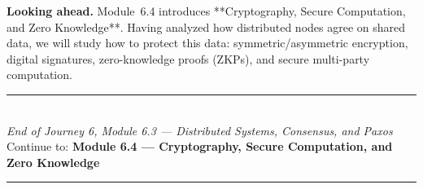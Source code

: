 \documentclass[12pt, a4paper]{book}
\begin{document}
\medskip
\noindent\textbf{Looking ahead.}
Module~6.4 introduces **Cryptography, Secure Computation, and Zero Knowledge**. Having analyzed how distributed nodes agree on shared data, we will study how to protect this data: symmetric/asymmetric encryption, digital signatures, zero-knowledge proofs (ZKPs), and secure multi-party computation.

\vspace{1.4cm}
\begin{center}
{\color{JourneyColor}\rule{0.5\linewidth}{0.8pt}}\\[6pt]
{\small\color{JourneyColor}\textit{End of Journey 6, Module 6.3 --- Distributed Systems, Consensus, and Paxos}}\\[4pt]
{\small\color{JourneyColor}Continue to: \textbf{Module 6.4 --- Cryptography, Secure Computation, and Zero Knowledge}}\\[6pt]
{\color{JourneyColor}\rule{0.5\linewidth}{0.8pt}}
\end{center}
\end{document}
